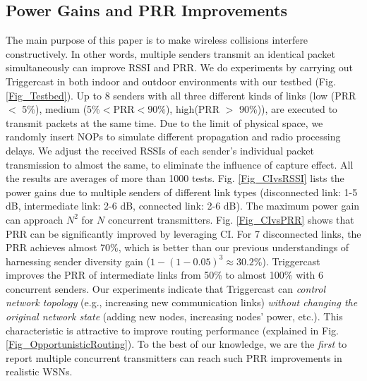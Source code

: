 \documentclass[conference]{IEEEtran}
\begin{document}
\subsection{Power Gains and PRR Improvements}
\label{subsec_NEWLINK}
\indent The main purpose of this paper is to make wireless collisions interfere constructively.
In other words, multiple senders transmit an identical packet simultaneously can improve RSSI and PRR.
We do experiments by carrying out Triggercast in both indoor and outdoor environments with our testbed (Fig. \ref{Fig_Testbed}).
Up to 8 senders with all three different kinds of links (low (PRR $<$ 5$\%$), medium (5$\%<$PRR$<90\%$), high(PRR $>$ 90$\%$)), are executed to transmit packets at the same time.
Due to the limit of physical space, we randomly insert NOPs to simulate different propagation and radio processing delays.
We adjust the received RSSIs of each sender's individual packet transmission to almost the same, to eliminate the influence of capture effect.
All the results are averages of more than 1000 tests.
Fig. \ref{Fig_CIvsRSSI} lists the power gains due to multiple senders of different link types (disconnected link: 1-5 dB, intermediate link: 2-6 dB, connected link: 2-6 dB).
The maximum power gain can approach $N^2$ for $N$ concurrent transmitters.
Fig. \ref{Fig_CIvsPRR} shows that PRR can be significantly improved by leveraging CI.
For 7 disconnected links, the PRR achieves almost 70\%, which is better than our previous understandings of harnessing sender diversity gain ($1-(1-0.05)^3\approx 30.2\%$).
Triggercast improves the PRR of intermediate links from 50\% to almost 100\% with 6 concurrent senders.
Our experiments indicate that Triggercast can \emph{control network topology} (e.g., increasing new communication links) \emph{without changing the original network state} (adding new nodes, increasing nodes' power, etc.).
This characteristic is attractive to improve routing performance (explained in Fig. \ref{Fig_OpportunisticRouting}).
To the best of our knowledge, we are the \emph{first} to report multiple concurrent transmitters can reach such PRR improvements in realistic WSNs.
\end{document}
